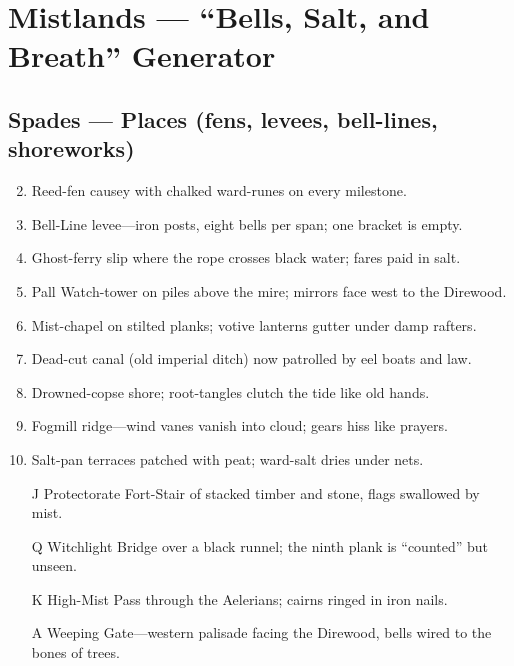 \chapter{Mistlands --- ``Bells, Salt, and Breath'' Generator}

\section*{Spades --- Places (fens, levees, bell-lines, shoreworks)}
\begin{enumerate}
\setcounter{enumi}{1}
\item Reed-fen causey with chalked ward-runes on every milestone.
\item Bell-Line levee---iron posts, eight bells per span; one bracket is empty.
\item Ghost-ferry slip where the rope crosses black water; fares paid in salt.
\item Pall Watch-tower on piles above the mire; mirrors face west to the Direwood.
\item Mist-chapel on stilted planks; votive lanterns gutter under damp rafters.
\item Dead-cut canal (old imperial ditch) now patrolled by eel boats and law.
\item Drowned-copse shore; root-tangles clutch the tide like old hands.
\item Fogmill ridge---wind vanes vanish into cloud; gears hiss like prayers.
\item Salt-pan terraces patched with peat; ward-salt dries under nets.
\item[J] Protectorate Fort-Stair of stacked timber and stone, flags swallowed by mist.
\item[Q] Witchlight Bridge over a black runnel; the ninth plank is ``counted'' but unseen.
\item[K] High-Mist Pass through the Aelerians; cairns ringed in iron nails.
\item[A] Weeping Gate---western palisade facing the Direwood, bells wired to the bones of trees.
\end{enumerate}

